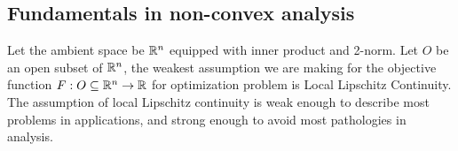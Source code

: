 \documentclass[12pt]{article}
\begin{document}
    \subsection{Fundamentals in non-convex analysis}
        Let the ambient space be $\mathbb R^n$ equipped with inner product and 2-norm. 
        Let $O$ be an open subset of $\mathbb R^n$, the weakest assumption we are making for the objective function $F: O \subseteq \mathbb R^n \rightarrow \mathbb R$ for optimization problem is Local Lipschitz Continuity. 
        The assumption of local Lipschitz continuity is weak enough to describe most problems in applications, and strong enough to avoid most pathologies in analysis. 
\end{document}
